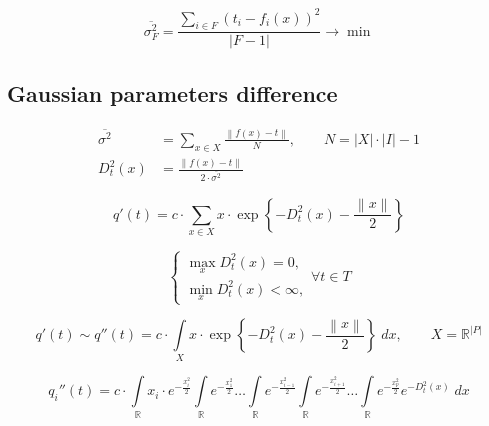 \begin{equation*}
  \overline{\sigma_F^2}
  = \frac{\sum\limits_{i \in F} \left( t_i - f_i\left( x \right) \right)^2}
         {\left| F - 1 \right|}
  \to \min
\end{equation*}

\subsection{Gaussian parameters difference}

\begin{equation*}
  \begin{split}
    \overline{\sigma^2}
      &= \sum_{x \in X} \frac{\left\| f\left( x \right) - t \right\|}{N}, \qquad
      N = \left| X \right| \cdot \left| I \right| - 1 \\
    D_t^2\left( x \right)
      &= \frac{\left\| f\left( x \right) - t \right\|}
              {2 \cdot \overline{\sigma^2}}
  \end{split}
\end{equation*}

\begin{equation*}
  q'\left( t \right)
  =
  c \cdot
  \sum_{x \in X}
  x
  \cdot \exp{\left\{
    - D_t^2\left( x \right)
    - \frac{\left\| x \right\|}{2} \right\}}
\end{equation*}

\begin{equation*}
  \begin{cases}
    \max\limits_{x} D_t^2\left( x \right) = 0, \\
    \min\limits_{x} D_t^2\left( x \right) < \infty,
  \end{cases} \forall t \in T
\end{equation*}

\begin{equation*}
  q'\left( t \right)
  \sim
  q''\left( t \right)
  =
  c \cdot
  \int\limits_{X}
    x
    \cdot \exp{\left\{
      - D_t^2\left( x \right)
      - \frac{\left\| x \right\|}{2} \right\}} \;dx, \qquad
  X = \mathbb{R}^{\left| P \right|}
\end{equation*}

\begin{equation*}
  q_i''\left( t \right)
  =
  c \cdot
  \int\limits_{\mathbb{R}} x_i \cdot e^{- \frac{x_i^2}{2}}
  \int\limits_{\mathbb{R}} e^{- \frac{x_1^2}{2}}
  \dots
  \int\limits_{\mathbb{R}} e^{- \frac{x_{i-1}^2}{2}}
  \int\limits_{\mathbb{R}} e^{- \frac{x_{i+1}^2}{2}}
  \dots
  \int\limits_{\mathbb{R}} e^{- \frac{x_p^2}{2}} e^{-D_t^2\left( x \right)}
  \;dx
\end{equation*}

